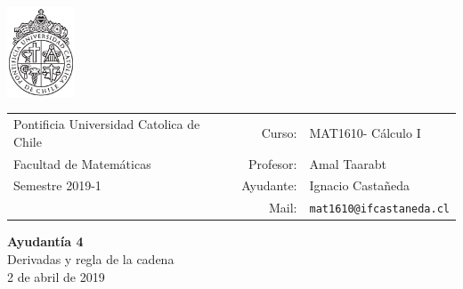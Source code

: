\documentclass[12pt]{article}
\makeatletter
\newcommand{\ayudantia}{{\sc Ayudantía 4}}
\newcommand{\tituloayu}{Derivadas y regla de la cadena}
\newcommand{\fecha}{2 de abril de 2019}
\newcommand{\sigla}{MAT1610}
\newcommand{\nombre}{Cálculo I}
\newcommand{\profesor}{Amal Taarabt}
\newcommand{\ano}{2019}
\newcommand{\semestre}{1}
\newcommand{\mail}{mat1610@ifcastaneda.cl}
\makeatother
\begin{document}
\thispagestyle{empty}

\begin{minipage}{2cm}
	\includegraphics[width=2cm]{../../../../img/logo.pdf}
	\vspace{0.5cm}
\end{minipage}
\begin{minipage}{\linewidth}
	\begin{tabular}{lrl}
		{\scriptsize\sc Pontificia Universidad Catolica de Chile} & \hspace*{0.7in}Curso: &
		\sigla  - \nombre\\
		{\sc Facultad de Matemáticas}&
		Profesor: & \profesor \\
		{\sc Semestre \ano-\semestre} & Ayudante: & {Ignacio Castañeda}\\
		& {Mail:} & \texttt{\mail}
	\end{tabular}
\end{minipage}

\vspace{-10mm}
\begin{center}
	{\LARGE\bf \ayudantia}\\
	\vspace{0.1cm}
	{\tituloayu}\\
	\vspace{0.1cm}
	\fecha\\
	\vspace{0.4cm}
\end{center}
\end{document}
